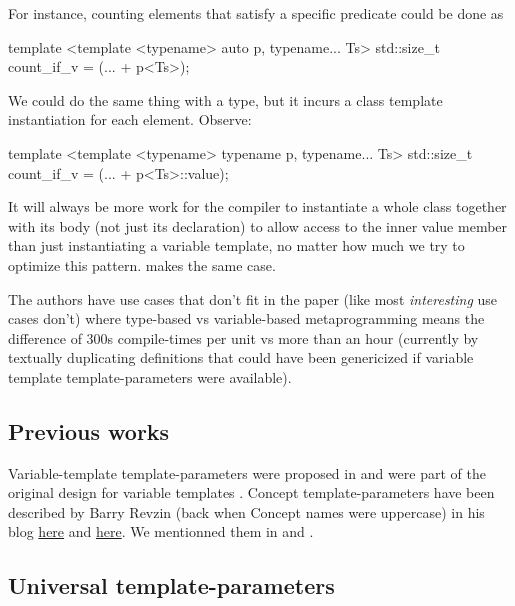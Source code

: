 \documentclass{wg21}
\begin{document}
For instance, counting elements that satisfy a specific predicate could be done as

\begin{colorblock}
template <template <typename> auto p, typename... Ts>
std::size_t count_if_v = (... + p<Ts>);
\end{colorblock}

We could do the same thing with a type, but it incurs a class template instantiation for each element. Observe:

\begin{colorblock}
template <template <typename> typename p, typename... Ts>
std::size_t count_if_v = (... + p<Ts>::value);
\end{colorblock}

It will always be more work for the compiler to instantiate a whole class together with its body (not just its declaration) to allow access to the inner value member than just instantiating a variable template, no matter how much we try to optimize this pattern.  makes the same case.

The authors have use cases that don't fit in the paper (like most \emph{interesting} use cases don't) where type-based vs variable-based metaprogramming means the difference of 300s compile-times per unit vs more than an hour (currently by textually duplicating definitions that could have been genericized if variable template template-parameters were available).

\subsection{Previous works}

Variable-template template-parameters were proposed in  and were part of the original design for variable templates .
Concept template-parameters have been described by Barry Revzin (back when Concept names were uppercase) in his blog \href{https://brevzin.github.io/c++/2019/01/09/concept-templates/}{here} and \href{https://brevzin.github.io/c++/2019/03/24/concept-templates-2/}{here}.
We mentionned them in  and .

\subsection{Universal template-parameters}
\end{document}

